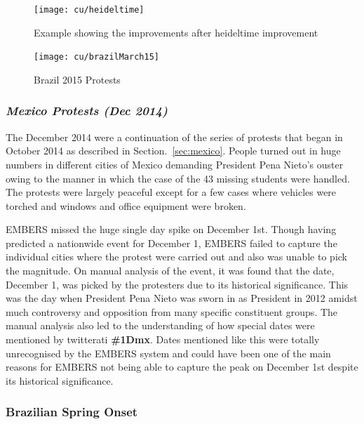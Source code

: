 \begin{figure}
\texttt{[image: cu/heideltime]}
\caption{Example showing the improvements after heideltime improvement}
\label{fig:heideltime}
\end{figure}


\begin{figure}[H]
\centering
\texttt{[image: cu/brazilMarch15]}
\caption{Brazil 2015 Protests}
\label{fig:brazilSpring}
\end{figure}

\subsubsection{\it Mexico Protests (Dec 2014)}
The December 2014 were a continuation of the series of protests that began in October 2014
as described in Section.~\ref{sec:mexico}. People turned out in huge numbers in different cities of Mexico demanding
President Pena Nieto's ouster owing to the manner in which the case of the 43 missing students were handled.
The protests were largely peaceful except for a few cases where vehicles were torched and windows and office equipment
were broken.

EMBERS missed the huge single day spike on December 1st. Though having predicted a nationwide event for
December 1, EMBERS failed to capture the individual cities where the protest were carried out and also was unable
to pick the magnitude. On manual analysis of the event, it was found that the date, December 1,  was picked by the protesters due to
its historical significance. This was the day when President Pena Nieto was sworn
in as President in 2012 amidst much controversy and opposition from
many specific constituent groups. The manual analysis also led to the understanding of how
special dates were mentioned by twitterati {\bf \#1Dmx}. Dates mentioned like this were totally unrecognised by the EMBERS
system and could have been one of the main reasons for EMBERS not being able to capture the peak on December 1st despite its
historical significance.

\subsubsection{Brazilian Spring Onset}

